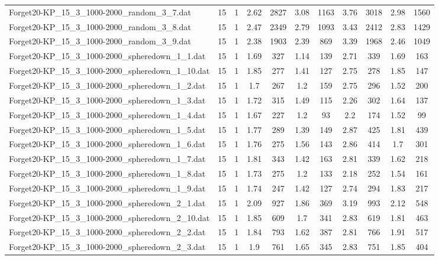 \begin{table}[!ht]
\begin{tabular}{lcccccccccc}
Forget20-KP\_15\_3\_1000-2000\_random\_3\_7.dat & 15 & 1 & 2.62 & 2827 & 3.08 & 1163 & 3.76 & 3018 & 2.98 & 1560 \\
Forget20-KP\_15\_3\_1000-2000\_random\_3\_8.dat & 15 & 1 & 2.47 & 2349 & 2.79 & 1093 & 3.43 & 2412 & 2.83 & 1429 \\
Forget20-KP\_15\_3\_1000-2000\_random\_3\_9.dat & 15 & 1 & 2.38 & 1903 & 2.39 & 869 & 3.39 & 1968 & 2.46 & 1049 \\
Forget20-KP\_15\_3\_1000-2000\_spheredown\_1\_1.dat & 15 & 1 & 1.69 & 327 & 1.14 & 139 & 2.71 & 339 & 1.69 & 163 \\
Forget20-KP\_15\_3\_1000-2000\_spheredown\_1\_10.dat & 15 & 1 & 1.85 & 277 & 1.41 & 127 & 2.75 & 278 & 1.85 & 147 \\
Forget20-KP\_15\_3\_1000-2000\_spheredown\_1\_2.dat & 15 & 1 & 1.7 & 267 & 1.2 & 159 & 2.75 & 296 & 1.52 & 200 \\
Forget20-KP\_15\_3\_1000-2000\_spheredown\_1\_3.dat & 15 & 1 & 1.72 & 315 & 1.49 & 115 & 2.26 & 302 & 1.64 & 137 \\
Forget20-KP\_15\_3\_1000-2000\_spheredown\_1\_4.dat & 15 & 1 & 1.67 & 227 & 1.2 & 93 & 2.2 & 174 & 1.52 & 99 \\
Forget20-KP\_15\_3\_1000-2000\_spheredown\_1\_5.dat & 15 & 1 & 1.77 & 289 & 1.39 & 149 & 2.87 & 425 & 1.81 & 439 \\
Forget20-KP\_15\_3\_1000-2000\_spheredown\_1\_6.dat & 15 & 1 & 1.76 & 275 & 1.56 & 143 & 2.86 & 414 & 1.7 & 301 \\
Forget20-KP\_15\_3\_1000-2000\_spheredown\_1\_7.dat & 15 & 1 & 1.81 & 343 & 1.42 & 163 & 2.81 & 339 & 1.62 & 218 \\
Forget20-KP\_15\_3\_1000-2000\_spheredown\_1\_8.dat & 15 & 1 & 1.73 & 275 & 1.2 & 133 & 2.18 & 252 & 1.54 & 161 \\
Forget20-KP\_15\_3\_1000-2000\_spheredown\_1\_9.dat & 15 & 1 & 1.74 & 247 & 1.42 & 127 & 2.74 & 294 & 1.83 & 217 \\
Forget20-KP\_15\_3\_1000-2000\_spheredown\_2\_1.dat & 15 & 1 & 2.09 & 927 & 1.86 & 369 & 3.19 & 993 & 2.12 & 548 \\
Forget20-KP\_15\_3\_1000-2000\_spheredown\_2\_10.dat & 15 & 1 & 1.85 & 609 & 1.7 & 341 & 2.83 & 619 & 1.81 & 463 \\
Forget20-KP\_15\_3\_1000-2000\_spheredown\_2\_2.dat & 15 & 1 & 1.84 & 793 & 1.62 & 387 & 2.81 & 766 & 1.91 & 517 \\
Forget20-KP\_15\_3\_1000-2000\_spheredown\_2\_3.dat & 15 & 1 & 1.9 & 761 & 1.65 & 345 & 2.83 & 751 & 1.85 & 404 \\

\end{tabular}
\end{table}
